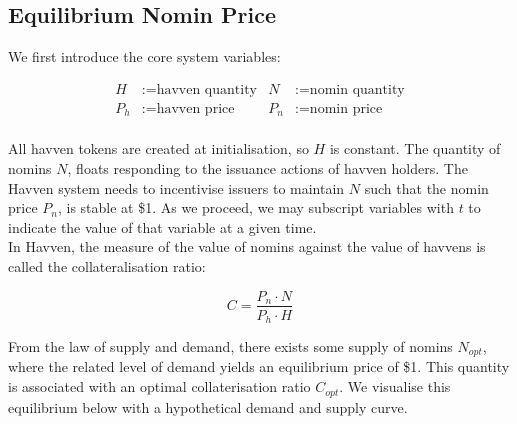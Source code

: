 \newpage

\subsection{Equilibrium Nomin Price}

\noindent We first introduce the core system variables:

\begin{align*}
H &:= \text{havven quantity} & N &:= \text{nomin quantity} \\
P_h &:= \text{havven price}  & P_n &:= \text{nomin price} \\
\end{align*}


\noindent All havven tokens are created at initialisation, so $H$ is constant.
The quantity of nomins $N$, floats responding to the issuance actions of havven holders.
The Havven system needs to incentivise issuers to maintain $N$ such that
the nomin price $P_n$, is stable at \$1. As we proceed, we may subscript variables with $t$ to indicate the value of that variable at a given time. \\

\noindent In Havven, the measure of the value of nomins against the value
of havvens is called the collateralisation ratio:

\begin{equation}
C = \frac{P_n \cdot N}{P_h \cdot H} \label{eq:collateralisation}
\end{equation}

\vspace{3 mm}

\noindent From the law of supply and demand, there exists some supply
of nomins $N_{opt}$, where the related level of demand yields an equilibrium
price of \$1. This quantity is associated with an optimal collaterisation ratio
$C_{opt}$. We visualise this equilibrium below with a hypothetical demand and supply curve.  \\

\begin{center}
\end{center}

